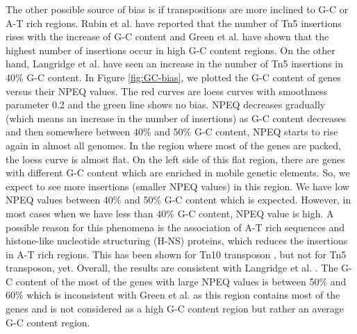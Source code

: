 \documentclass[12pt,letterpaper]{article}
\begin{document}
The other possible source of bias is if transpositions are more inclined to G-C or A-T rich regions. Rubin et al. \cite{rubin_essential_2015} have reported that the number of Tn5 insertions rises with the increase of G-C content and Green et al. \cite{green_insertion_2012} have shown that the highest number of insertions occur in high G-C content regions. On the other hand, Langridge et al. \cite{langridge_simultaneous_2009} have seen an increase in the number of Tn5 insertions in 40\% G-C content. In Figure \ref{fig:GC-bias}, we plotted the G-C content of genes versus their NPEQ values. The red curves are loess curves with smoothness parameter 0.2 and the green line shows no bias. %
NPEQ decreases gradually (which means an increase in the number of insertions) as G-C content decreases and then somewhere between 40\% and 50\% G-C content, NPEQ starts to rise again in almost all genomes. %
In the region where most of the genes are packed, the loess curve is almost flat. On the left side of this flat region, there are genes with different G-C content which are enriched in mobile genetic elements. So, we expect to see more insertions (smaller NPEQ values) in this region. We have low NPEQ values between 40\% and 50\% G-C content which is expected. However, in most cases when we have less than 40\% G-C content, NPEQ value is high. A possible reason for this phenomena is the association of A-T rich sequences and histone-like nucleotide structuring (H-NS) proteins, which reduces the insertions in A-T rich regions. This has been shown for Tn10 transposon \cite{kimura_nucleoid_2016}, but not for Tn5 transposon, yet. Overall, the results are consistent with Langridge et al. \cite{langridge_simultaneous_2009}. The G-C content of the most of the genes with large NPEQ values is between 50\% and 60\% which is inconsistent with Green et al. \cite{green_insertion_2012} as this region contains most of the genes and is not considered as a high G-C content region but rather an average G-C content region. %
\end{document}
